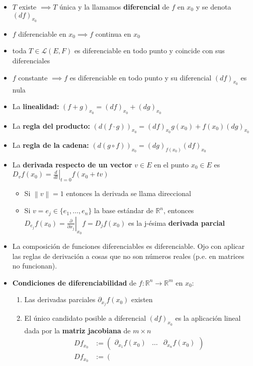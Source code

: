 \documentclass[a4paper,twocolumn]{extarticle}
\newcommand{\R}{\mathbb{R}}
\newcommand{\norma}[1]{\left\lVert#1\right\rVert}
\newcommand{\lacot}[1]{\mathcal{L}(#1)}
\begin{document}
\begin{itemize}
	\item $T$ existe $\implies T$ única y la llamamos \textbf{diferencial} de $f$ en $x_0$ y se denota $(df)_{x_0}$
	\item $f$ diferenciable en $x_0 \implies f$ continua en $x_0$
	\item toda $T \in \lacot{E,F}$ es diferenciable en todo punto y coincide con sus diferenciales
	\item $f$ constante $\implies f$ es diferenciable en todo punto y su diferencial $(df)_{x_0}$ es nula
	\item La \textbf{linealidad:} $(f + g)_{x_0} = (df)_{x_0} + (dg)_{x_0}$
	\item La \textbf{regla del producto:} $(d(f\cdot g))_{x_0} = (df)_{x_0}g(x_0) + f(x_0)(dg)_{x_0}$
	\item La \textbf{regla de la cadena:} $(d(g \circ f))_{x_0} = (dg)_{f(x_0)} (df)_{x_0}$
	\item La \textbf{derivada respecto de un vector} $v \in E$ en el punto $x_0 \in E$ es $D_vf(x_0) = \left.\frac{d}{dt}\right|_{t=0}f(x_0 + tv)$
	\begin{itemize}
		\item Si $\norma{v} = 1$ entonces la derivada se llama direccional
		\item Si $v = e_j \in \{e_1, \dots, e_n\}$ la base estándar de $\R^n$, entonces $D_{e_j}f(x_0) = \left.\frac{\partial}{\partial x_j}\right|_{x_0}f = D_jf(x_0)$ es la j-ésima \textbf{derivada parcial}
	\end{itemize}
	\item La composición de funciones diferenciables es diferenciable. Ojo con aplicar las reglas de derivación a cosas que no son números reales (p.e. en matrices no funcionan).
	\item \textbf{Condiciones de diferenciabilidad} de $f:\R^n \to \R^m$ en $x_0$:
	\begin{enumerate}
		\item Las derivadas parciales $\partial_{x_j}f(x_0)$ existen
		\item El único candidato posible a diferencial $(df)_{x_0}$ es la aplicación lineal dada por la \textbf{matriz jacobiana} de $m \times n$
		\begin{align*}
			Df_{x_0} &:= \left(\begin{array}{c|c|c}
				\partial_{x_1}f(x_0) & \dots & \partial_{x_n}f(x_0)
			\end{array}\right)\\
			Df_{x_0} &:= \left(\begin{array}{c}

\end{array}
\end{align*}
\end{enumerate}
\end{itemize}
\end{document}
